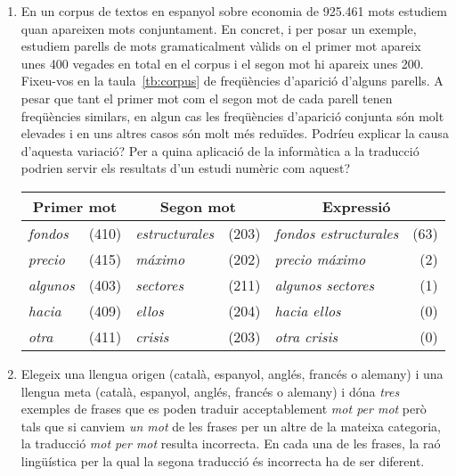 \begin{enumerate}
\item En un corpus de textos en espanyol sobre economia de 925.461
      mots estudiem quan apareixen mots conjuntament. En concret, i
      per posar un exemple, estudiem parells de mots gramaticalment
      vàlids on el primer mot apareix unes 400 vegades en total en el
      corpus i el segon mot hi apareix unes 200.  Fixeu-vos en la
      taula~\ref{tb:corpus} de freqüències d'aparició d'alguns
      parells. A pesar que tant el primer mot com el segon mot de cada
      parell tenen freqüències similars, en algun cas les
      freqüències d'aparició conjunta són molt elevades i en uns
      altres casos són molt més reduïdes.  Podríeu explicar la causa
      d'aquesta variació? Per a quina aplicació de la informàtica a la
      traducció podrien servir els resultats d'un estudi numèric com
      aquest?
  \begin{table*}
  \begin{center}
  \begin{tabular}{lr|lr|lr}
  \hline\hline
  \multicolumn{2}{c|}{\textsf{Primer mot}} &
  \multicolumn{2}{c|}{\textsf{Segon mot}} & 
  \multicolumn{2}{c}{\textsf{Expressió}}
   \\
  \hline
  \emph{fondos} & (410) & \emph{estructurales} & (203) & \emph{fondos
  estructurales} & (63) \\
  \emph{precio} & (415) & \emph{máximo} & (202) & \emph{precio máximo}
  & (2) \\
  \emph{algunos} & (403) & \emph{sectores} & (211) & \emph{algunos
  sectores} & (1) \\
  \emph{hacia} & (409) & \emph{ellos} & (204) & \emph{hacia ellos} &
  (0) \\
  \emph{otra} & (411) & \emph{crisis} & (203) & \emph{otra crisis} &
  (0) \\

  \hline
  \end{tabular}
  \end{center}
  \caption{Freqüències d'aparició de parells de mots sobre economia.}
  \label{tb:corpus}
  \end{table*}

\item Elegeix una llengua origen (català, espanyol, anglés, francés o
  alemany) i una llengua meta (català, espanyol, anglés, francés o   
  alemany) i dóna \emph{tres} exemples de frases que es poden traduir
  acceptablement \emph{mot per mot} però tals que si canviem \emph{un
    mot} de les frases per un altre de la mateixa categoria, la
  traducció \emph{mot per mot} resulta incorrecta. En cada una de les
  frases, la raó lingüística per la qual la segona traducció és
  incorrecta ha de ser diferent.


\end{enumerate}
